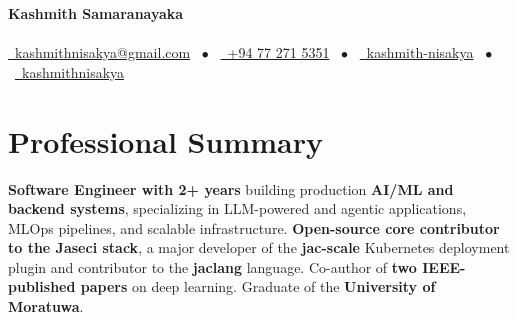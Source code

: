 
\begin{center}
\textbf{\Huge Kashmith Samaranayaka} \\[8pt]
{\Large \textbf{\jobtitle}} \\[6pt]
\small
\href{mailto:kashmithnisakya@gmail.com}{\raisebox{-0.05\height}\faEnvelope\ kashmithnisakya@gmail.com} \ $\bullet$ \
\href{tel:+94 77 271 5351}{\raisebox{-0.05\height}\faMobile\ +94 77 271 5351} \ $\bullet$ \
\href{https://www.linkedin.com/in/kashmith-nisakya/}{\raisebox{-0.05\height}\faLinkedin\ kashmith-nisakya} \ $\bullet$ \
\href{https://github.com/kashmithnisakya}{\raisebox{-0.05\height}\faGithub\ kashmithnisakya}
\end{center}

\section{\Large Professional Summary}
\begin{justify}
\textbf{Software Engineer with 2+ years} building production \textbf{AI/ML and backend systems}, specializing in LLM-powered and agentic applications, MLOps pipelines, and scalable infrastructure. \textbf{Open-source core contributor to the Jaseci stack}, a major developer of the \textbf{jac-scale} Kubernetes deployment plugin and contributor to the \textbf{jaclang} language. Co-author of \textbf{two IEEE-published papers} on deep learning. Graduate of the \textbf{University of Moratuwa}.
\end{justify}





\newpage




